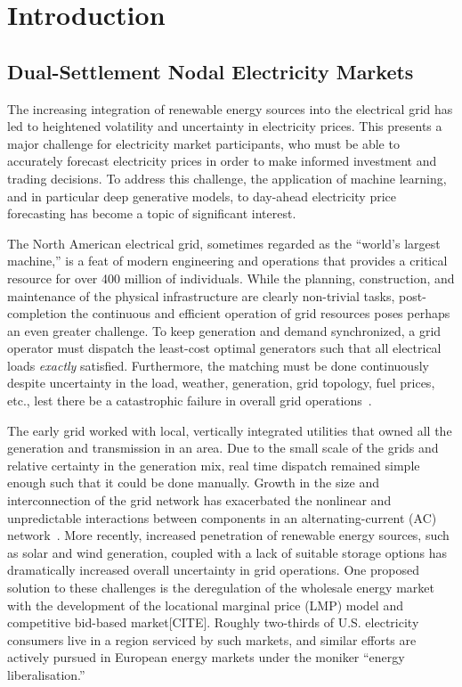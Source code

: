 \chapter{Introduction}\label{ch:intro}

\section{Dual-Settlement Nodal Electricity Markets}\label{sec:dual-settlement-nodal-electricity-markets}

The increasing integration of renewable energy sources into the electrical grid has led to heightened volatility and
uncertainty in electricity prices.
This presents a major challenge for electricity market participants, who must be able
to accurately forecast electricity prices in order to make informed investment and trading decisions.
To address this challenge, the application of machine learning, and in particular deep generative models, to
day-ahead electricity price forecasting has become a topic of significant interest.

The North American electrical grid, sometimes regarded as the ``world's largest machine,'' is a feat of modern
engineering and operations that provides a critical resource for over 400 million of individuals.
While the planning, construction, and maintenance of the physical infrastructure are clearly non-trivial tasks,
post-completion the continuous and efficient operation of grid resources poses perhaps an even greater challenge.
To keep generation and demand synchronized, a grid operator must dispatch the least-cost optimal
generators such that all electrical loads \textit{exactly} satisfied.
Furthermore, the matching must be done continuously despite uncertainty in the load, weather, generation,
grid topology, fuel prices, etc., lest there be a catastrophic failure in overall grid operations~\cite{ercotfail}.

The early grid worked with local, vertically integrated utilities that owned all the generation and transmission in
an area.
Due to the small scale of the grids and relative certainty in the generation mix, real time dispatch remained simple
enough such that it could be done manually.
Growth in the size and interconnection of the grid network has exacerbated the nonlinear and unpredictable interactions
between components in an alternating-current (AC) network~\cite{grid_sensitivity}.
More recently, increased penetration of renewable energy sources, such as solar and wind generation, coupled
with a lack of suitable storage options has dramatically increased overall uncertainty in grid operations.
One proposed solution to these challenges is the deregulation of the wholesale energy market with the development of
the locational marginal price (LMP) model and competitive bid-based market[CITE].
Roughly two-thirds of U.S. electricity consumers live in a region serviced by such markets, and similar efforts are
actively pursued in European energy markets under the moniker ``energy liberalisation.''

